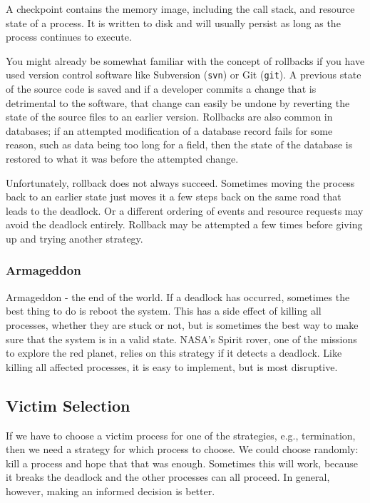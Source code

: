 A checkpoint contains the memory image, including the call stack, and resource state of a process. It is written to disk and will usually persist as long as the process continues to execute. 

You might already be somewhat familiar with the concept of rollbacks if you have used version control software like Subversion (\texttt{svn}) or Git (\texttt{git}). A previous state of the source code is saved and if a developer commits a change that is detrimental  to the software, that change can easily be undone by reverting the state of the source files to an earlier version. Rollbacks are also common in databases; if an attempted modification of a database record fails for some reason, such as data being too long for a field, then the state of the database is restored to what it was before the attempted change.

Unfortunately, rollback does not always succeed. Sometimes moving the process back to an earlier state just moves it a few steps back on the same road that leads to the deadlock.  Or a different ordering of events and resource requests may avoid the deadlock entirely. Rollback may be attempted a few times before giving up and trying another strategy.


\subsubsection*{Armageddon}
Armageddon - the end of the world. If a deadlock has occurred, sometimes the best thing to do is reboot the system. This has a side effect of killing all processes, whether they are stuck or not, but is sometimes the best way to make sure that the system is in a valid state. NASA's Spirit rover, one of the missions to explore the red planet, relies on this strategy if it detects a deadlock. Like killing all affected processes, it is easy to implement, but is most disruptive.


\subsection*{Victim Selection}
If we have to choose a victim process for one of the strategies, e.g., termination, then we need a strategy for which process to choose. We could choose randomly: kill a process and hope that that was enough. Sometimes this will work, because it breaks the deadlock and the other processes can all proceed. In general, however, making an informed decision is better. 

